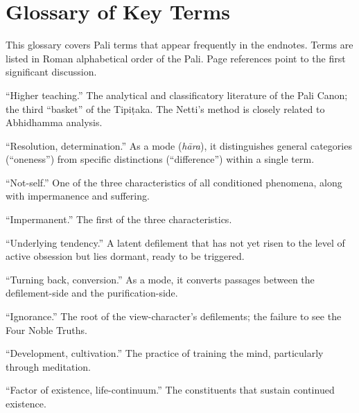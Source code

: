 \chapter{Glossary of Key Terms}

\noindent This glossary covers Pali terms that appear frequently in the endnotes. Terms are listed in Roman alphabetical order of the Pali. Page references point to the first significant discussion.

\bigskip

\begin{description}[style=nextline, labelwidth=3.5cm, leftmargin=3.8cm, font=\itshape]

\item[abhidhamma] ``Higher teaching.'' The analytical and classificatory literature of the Pali Canon; the third ``basket'' of the Tipiṭaka. The Netti's method is closely related to Abhidhamma analysis.

\item[adhiṭṭhāna] ``Resolution, determination.'' As a mode (\textit{hāra}), it distinguishes general categories (``oneness'') from specific distinctions (``difference'') within a single term.

\item[anattā] ``Not-self.'' One of the three characteristics of all conditioned phenomena, along with impermanence and suffering.

\item[anicca] ``Impermanent.'' The first of the three characteristics.

\item[anusaya] ``Underlying tendency.'' A latent defilement that has not yet risen to the level of active obsession but lies dormant, ready to be triggered.

\item[āvaṭṭa] ``Turning back, conversion.'' As a mode, it converts passages between the defilement-side and the purification-side.

\item[avijjā] ``Ignorance.'' The root of the view-character's defilements; the failure to see the Four Noble Truths.

\item[bhāvanā] ``Development, cultivation.'' The practice of training the mind, particularly through meditation.

\item[bhavaṅga] ``Factor of existence, life-continuum.'' The constituents that sustain continued existence.


\end{description}
